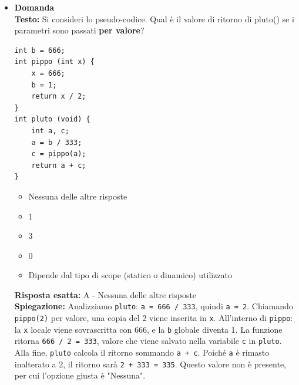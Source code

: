 \documentclass[12pt, a4paper]{article}
\newcounter{domandateoria}
\begin{document}
\begin{itemize}
    \item {}\textbf{Domanda \thedomandateoria} \\
    \textbf{Testo:} Si consideri lo pseudo-codice. Qual è il valore di ritorno di pluto() se i parametri sono passati \textbf{per valore}?
\begin{verbatim}
int b = 666;
int pippo (int x) {
    x = 666;
    b = 1;
    return x / 2;
}
int pluto (void) {
    int a, c;
    a = b / 333;
    c = pippo(a);
    return a + c;
}
\end{verbatim}
    \begin{itemize}
        \item[A)] Nessuna delle altre risposte
        \item[B)] 1
        \item[C)] 3
        \item[D)] 0
        \item[E)] Dipende dal tipo di scope (statico o dinamico) utilizzato
    \end{itemize}
    \textbf{Risposta esatta:} A - Nessuna delle altre risposte \\
    \textbf{Spiegazione:} Analizziamo \texttt{pluto}: \texttt{a = 666 / 333}, quindi \texttt{a = 2}. Chiamando \texttt{pippo(2)} per valore, una copia del 2 viene inserita in \texttt{x}. All'interno di \texttt{pippo}: la \texttt{x} locale viene sovrascritta con 666, e la \texttt{b} globale diventa 1. La funzione ritorna \texttt{666 / 2 = 333}, valore che viene salvato nella variabile \texttt{c} in \texttt{pluto}. Alla fine, \texttt{pluto} calcola il ritorno sommando \texttt{a + c}. Poiché \texttt{a} è rimasto inalterato a 2, il ritorno sarà \texttt{2 + 333 = 335}. Questo valore non è presente, per cui l'opzione giusta è "Nessuna".
    \vspace{0.3cm}

\newpage


\end{itemize}
\end{document}
